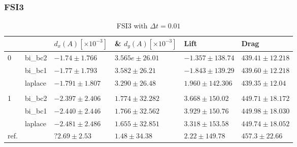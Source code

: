\subsubsection*{FSI3}
\begin{table}[]
\centering
\caption{FSI3 with $\Delta t = 0.01$}
\label{my-label}
\begin{tabular}{|l|l|l|l|l|l|}
\hline
 &  & $d_x(A) [\times10^{-3}]$ & \& $d_y(A)[\times10^{-3}]$ & Lift & Drag \\ \hline
0 & bi\_bc2 & $-1.74 \pm 1.766$ & $ 3.565e \pm 26.01 $ & $ -1.357 \pm 138.74$ & $439.41 \pm12.218$ \\ \hline
 & bi\_bc1 & $-1.77 \pm 1.793$ & $ 3.582 \pm 26.21 $ & $ -1.843 \pm 139.29$ & $439.60\pm12.218$ \\ \hline
 & laplace & $-1.791 \pm 1.807$ & $ 3.290 \pm 26.48 $ & $1.960 \pm 142.306$ & $ 439.35 \pm 12.04$ \\ \hline
 &  &  &  &  &  \\ \hline
1 & bi\_bc2 & $-2.397 \pm 2.406$ & $ 1.774 \pm 32.282 $ & $ 3.668 \pm 150.02$ & $ 449.71 \pm 18.172$ \\ \hline
 & bi\_bc1 & $ -2.440 \pm 2.446$ & $ 1.766 \pm 32.562 $ & $ 3.929 \pm 150.76$ & $ 449.98 \pm 18.030$ \\ \hline
 & laplace & $ -2.481 \pm 2.486$ & $ 1.655 \pm 32.851$ & $ 3.318 \pm 153.58$ & $ 449.74 \pm18.052$ \\ \hline
ref. &  & $ ?2.69 \pm 2.53$ & $1.48 \pm 34.38 $ & $ 2.22 \pm 149.78$ & $ 457.3 \pm 22.66$ \\ \hline
\end{tabular}
\end{table}











